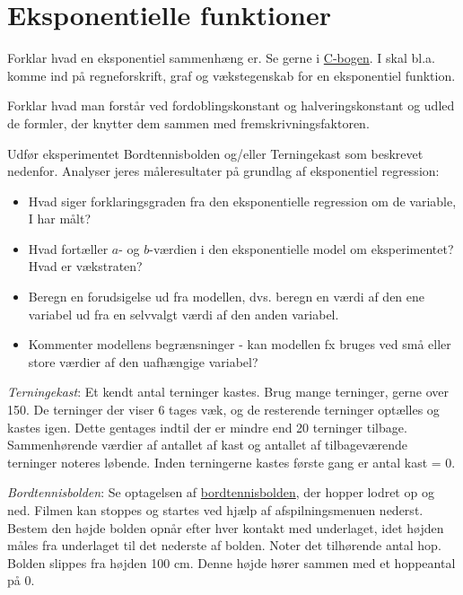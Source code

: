 \documentclass[10pt,a4paper,table]{article}
\begin{document}
\section{Eksponentielle funktioner}
\vspace{-0.7em}
Forklar hvad en eksponentiel sammenhæng er. Se gerne i \href{https://plusstxa1.systime.dk/?id=1227}{C-bogen}. I skal bl.a. komme ind på regneforskrift, graf og vækstegenskab for en eksponentiel funktion.

Forklar hvad man forstår ved fordoblingskonstant og halveringskonstant og udled de formler, der knytter dem sammen med fremskrivningsfaktoren.

Udfør eksperimentet Bordtennisbolden og/eller Terningekast som beskrevet nedenfor. Analyser jeres måleresultater på grundlag af eksponentiel regression:

\begin{itemize}
  \item Hvad siger forklaringsgraden fra den eksponentielle regression om de variable, I har målt?
  \item Hvad fortæller $a$- og $b$-værdien i den eksponentielle model om eksperimentet? Hvad er vækstraten?
  \item Beregn en forudsigelse ud fra modellen, dvs. beregn en værdi af den ene variabel ud fra en selvvalgt værdi af den anden variabel.
  \item Kommenter modellens begrænsninger - kan modellen fx bruges ved små eller store værdier af den uafhængige variabel?
\end{itemize}

\emph{Terningekast}:
Et kendt antal terninger kastes. Brug mange terninger, gerne over 150. De terninger der viser 6 tages væk, og de resterende terninger optælles og kastes igen. Dette gentages indtil der er mindre end 20 terninger tilbage. Sammenhørende værdier af antallet af kast og antallet af tilbageværende terninger noteres løbende. Inden terningerne kastes første gang er antal kast = 0.

\emph{Bordtennisbolden}:
Se optagelsen af \href{https://plusstxa1.systime.dk/?id=1098#c8122}{bordtennisbolden}, der hopper lodret op og ned. Filmen kan stoppes og startes ved hjælp af afspilningsmenuen nederst. Bestem den højde bolden opnår efter hver kontakt med underlaget, idet højden måles fra underlaget til det nederste af bolden. Noter det tilhørende antal hop. Bolden slippes fra højden 100 cm. Denne højde hører sammen med et hoppeantal på 0.
\end{document}
